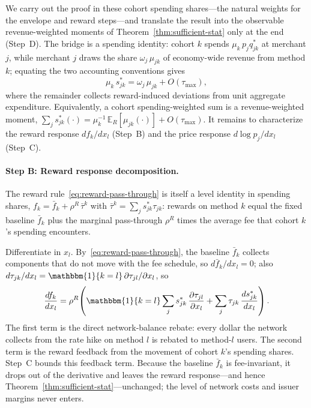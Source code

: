 \documentclass[main.tex]{subfiles}
\begin{document}
We carry out the proof in these cohort spending shares---the natural weights for the envelope and reward steps---and translate the result into the observable revenue-weighted moments of Theorem~\ref{thm:sufficient-stat} only at the end (Step~D).
The bridge is a spending identity: cohort $k$ spends $\mu_k\,p_j q^*_{jk}$ at merchant $j$, while merchant $j$ draws the share $\omega_j\,\mu_{jk}$ of economy-wide revenue from method $k$; equating the two accounting conventions gives
\begin{equation}
\mu_k\,s^*_{jk}=\omega_j\,\mu_{jk}+O(\tau_{\max}),
\label{eq:spending-identity}
\end{equation}
where the remainder collects reward-induced deviations from unit aggregate expenditure.
Equivalently, a cohort spending-weighted sum is a revenue-weighted moment, $\sum_j s^*_{jk}(\cdot)=\mu_k^{-1}\,\mathbb{E}_R[\mu_{jk}(\cdot)]+O(\tau_{\max})$.
It remains to characterize the reward response $df_k/dx_l$ (Step~B) and the price response $d\log p_j/dx_l$ (Step~C).

\paragraph{Step B: Reward response decomposition.}
The reward rule~\eqref{eq:reward-pass-through} is itself a level identity in spending shares, $f_k=\bar f_k+\rho^R\,\bar\tau^k$ with $\bar\tau^k=\sum_j s^*_{jk}\tau_{jk}$: rewards on method $k$ equal the fixed baseline $\bar f_k$ plus the marginal pass-through $\rho^R$ times the average fee that cohort $k$'s spending encounters.

Differentiate in $x_l$.
By~\eqref{eq:reward-pass-through}, the baseline $\bar f_k$ collects components that do not move with the fee schedule, so $d\bar f_k/dx_l=0$; also $d\tau_{jk}/dx_l=\mathbbm{1}\{k=l\}\,\partial\tau_{jl}/\partial x_l$, so
\begin{equation}
\frac{df_k}{dx_l}=\rho^R\!\left(\mathbbm{1}\{k=l\}\sum_j s^*_{jk}\,\frac{\partial\tau_{jl}}{\partial x_l}+\sum_j\tau_{jk}\,\frac{ds^*_{jk}}{dx_l}\right).
\label{eq:reward-decomp}
\end{equation}
The first term is the direct network-balance rebate: every dollar the network collects from the rate hike on method $l$ is rebated to method-$l$ users.
The second term is the reward feedback from the movement of cohort $k$'s spending shares.
Step~C bounds this feedback term.
Because the baseline $\bar f_k$ is fee-invariant, it drops out of the derivative and leaves the reward response---and hence Theorem~\ref{thm:sufficient-stat}---unchanged; the level of network costs and issuer margins never enters.
\end{document}
